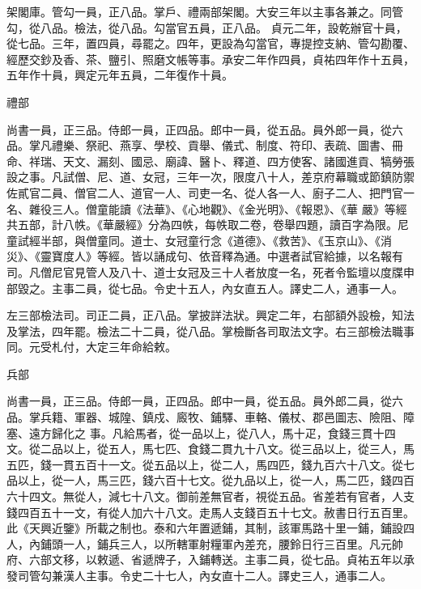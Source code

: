 \begin{pinyinscope}
 架閣庫。管勾一員，正八品。掌戶、禮兩部架閣。大安三年以主事各兼之。同管勾，從八品。檢法，從八品。勾當官五員，正八品。
 貞元二年，設乾辦官十員，從七品。三年，置四員，尋罷之。四年，更設為勾當官，專提控支納、管勾勘覆、經歷交鈔及香、茶、鹽引、照磨文帳等事。承安二年作四員，貞祐四年作十五員，五年作十員，興定元年五員，二年復作十員。



 禮部



 尚書一員，正三品。侍郎一員，正四品。郎中一員，從五品。員外郎一員，從六品。掌凡禮樂、祭祀、燕享、學校、貢舉、儀式、制度、符印、表疏、圖書、冊命、祥瑞、天文、漏刻、國忌、廟諱、醫卜、釋道、四方使客、諸國進貢、犒勞張設之事。凡試僧、尼、道、女冠，三年一次，限度八十人，差京府幕職或節鎮防禦佐貳官二員、僧官二人、道官一人、司吏一名、從人各一人、廚子二人、把門官一名、雜役三人。僧童能讀《法華》、《心地觀》、《金光明》、《報恩》、《華
 嚴》等經共五部，計八帙。《華嚴經》分為四帙，每帙取二卷，卷舉四題，讀百字為限。尼童試經半部，與僧童同。道士、女冠童行念《道德》、《救苦》、《玉京山》、《消災》、《靈寶度人》等經。皆以誦成句、依音釋為通。中選者試官給據，以名報有司。凡僧尼官見管人及八十、道士女冠及三十人者放度一名，死者令監壇以度牒申部毀之。主事二員，從七品。令史十五人，內女直五人。譯史二人，通事一人。



 左三部檢法司。司正二員，正八品。掌披詳法狀。興定二年，右部額外設檢，知法及掌法，四年罷。檢法二十二員，從八品。掌檢斷各司取法文字。右三部檢法職事同。元受札付，大定三年命給敕。



 兵部



 尚書一員，正三品。侍郎一員，正四品。郎中一員，從五品。員外郎二員，從六品。掌兵籍、軍器、城隍、鎮戍、廄牧、鋪驛、車輅、儀杖、郡邑圖志、險阻、障塞、遠方歸化之
 事。凡給馬者，從一品以上，從八人，馬十疋，食錢三貫十四文。從二品以上，從五人，馬七匹、食錢二貫九十八文。從三品以上，從三人，馬五匹，錢一貫五百十一文。從五品以上，從二人，馬四匹，錢九百六十八文。從七品以上，從一人，馬三匹，錢六百十七文。從九品以上，從一人，馬二匹，錢四百六十四文。無從人，減七十八文。御前差無官者，視從五品。省差若有官者，人支錢四百五十一文，有從人加六十八文。走馬人支錢百五十七文。赦書日行五百里。此《天興近鑒》所載之制也。泰和六年置遞鋪，其制，該軍馬路十里一鋪，鋪設四人，內鋪頭一人，鋪兵三人，以所轄軍射糧軍內差充，腰鈴日行三百里。凡元帥府、六部文移，以敕遞、省遞牌子，入鋪轉送。主事二員，從七品。貞祐五年以承發司管勾兼漢人主事。令史二十七人，內女直十二人。譯史三人，通事二人。




\end{pinyinscope}
